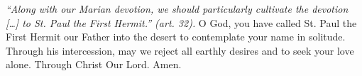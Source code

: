 \pagestyle{empty}
\hspace{0pt}
\vfill

\textit{``Along with our Marian devotion, we should particularly cultivate the devotion [\ldots] to St. Paul the First Hermit.'' (art. 32). }
\medbreak
O God, you have called St. Paul the First Hermit our 
Father into the desert to contemplate your name in solitude. Through
his intercession, may we reject all earthly desires and to seek your
love alone. Through Christ Our Lord. Amen.
\vfill
\hspace{0pt}
\newpage
